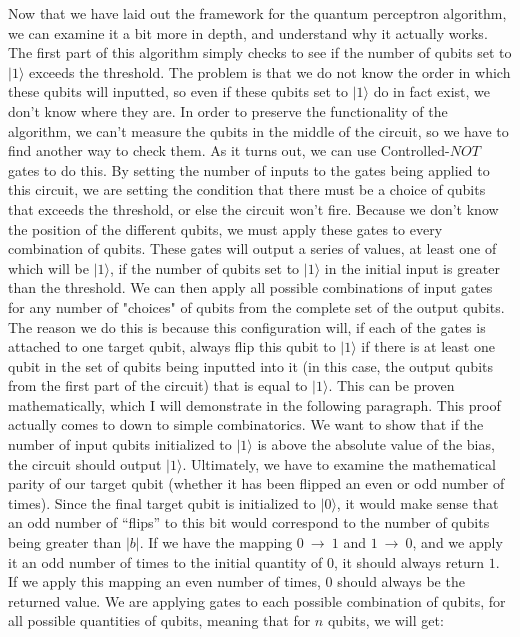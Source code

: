 \documentclass{article}
\begin{document}
\newline\newline
Now that we have laid out the framework for the quantum perceptron algorithm, we can examine it a bit more in depth, and understand why it actually works. The first part of this algorithm simply checks to see if the number of qubits set to $|1\rangle$ exceeds the threshold. The problem is that we do not know the order in which these qubits will inputted, so even if these qubits set to $|1\rangle$ do in fact exist, we don't know where they are. In order to preserve the functionality of the algorithm, we can't measure the qubits in the middle of the circuit, so we have to find another way to check them. As it turns out, we can use Controlled-$NOT$ gates to do this. By setting the number of inputs to the gates being applied to this circuit, we are setting the condition that there must be a choice of qubits that exceeds the threshold, or else the circuit won't fire. Because we don't know the position of the different qubits, we must apply these gates to every combination of qubits. These gates will output a series of values, at least one of which will be $|1\rangle$, if the number of qubits set to $|1\rangle$ in the initial input is greater than the threshold. We can then apply all possible combinations of input gates for any number of "choices" of qubits from the complete set of the output qubits. The reason we do this is because this configuration will, if each of the gates is attached to one target qubit, always flip this qubit to $|1\rangle$ if there is at least one qubit in the set of qubits being inputted into it (in this case, the output qubits from the first part of the circuit) that is equal to $|1\rangle$. This can be proven mathematically, which I will demonstrate in the following paragraph.
\newline\newline
This proof actually comes to down to simple combinatorics. We want to show that if the number of input qubits initialized to $|1\rangle$ is above the absolute value of the bias, the circuit should output $|1\rangle$. Ultimately, we have to examine the mathematical parity of our target qubit (whether it has been flipped an even or odd number of times). Since the final target qubit is initialized to $|0\rangle$, it would make sense that an odd number of “flips” to this bit would correspond to the number of qubits being greater than $|b|$. If we have the mapping $0 \ \rightarrow \ 1$ and $1 \ \rightarrow \ 0$, and we apply it an odd number of times to the initial quantity of $0$, it should always return $1$. If we apply this mapping an even number of times, $0$ should always be the returned value. We are applying gates to each possible combination of qubits, for all possible quantities of qubits, meaning that for $n$ qubits, we will get:
\end{document}
